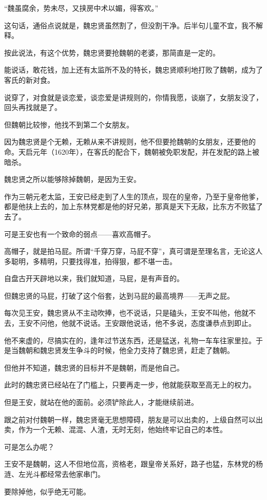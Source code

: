 \begin{multicols}{\theparacolNo}
“魏虽腐余，势未尽，又挟房中术以媚，得客欢。”

这句话，通俗点说就是，魏忠贤虽然割了，但没割干净。后半句儿童不宜，我不解释。

按此说法，有这个优势，魏忠贤要抢魏朝的老婆，那简直是一定的。

能说话，敢花钱，加上还有太监所不及的特长，魏忠贤顺利地打败了魏朝，成为了客氏的新对食。

说穿了，对食就是谈恋爱，谈恋爱是讲规则的，你情我愿，谈崩了，女朋友没了，回头再找就是了。

但魏朝比较惨，他找不到第二个女朋友。

因为魏忠贤是个无赖，无赖从来不讲规则，他不但要抢魏朝的女朋友，还要他的命。天启元年（1620年），在客氏的配合下，魏朝被免职发配，并在发配的路上被暗杀。

魏忠贤之所以能够除掉魏朝，是因为王安。

作为三朝元老太监，王安已经走到了人生的顶点，现在的皇帝，乃至于皇帝他爹，都是他扶上去的，加上东林党都是他的好兄弟，那真是天下无敌，比东方不败猛了去了。

可是王安也有一个致命的弱点——喜欢高帽子。

高帽子，就是拍马屁。所谓“千穿万穿，马屁不穿”，真可谓是至理名言，无论这人多聪明，多精明，只要找得准，拍得狠，都不堪一击。

自盘古开天辟地以来，我们就知道，马屁，是有声音的。

但魏忠贤的马屁，打破了这个俗套，达到马屁的最高境界——无声之屁。

每次见王安，魏忠贤从不主动吹捧，也不说话，只是磕头，王安不叫他，他就不去，王安不问他，他就不说话。王安跟他说话，他不多说，态度谦恭点到即止。

他不来虚的，尽搞实在的，逢年过节送东西，还是猛送，礼物一车车往家里拉。于是当魏朝和魏忠贤发生争斗的时候，他全力支持了魏忠贤，赶走了魏朝。

但他并不知道，魏忠贤的目标并不是魏朝，而是他自己。

此时的魏忠贤已经站在了门槛上，只要再走一步，他就能获取至高无上的权力。

但是王安，就站在他的面前。必须铲除此人，才能继续前进。

跟之前对付魏朝一样，魏忠贤毫无思想障碍，朋友是可以出卖的，上级自然可以出卖，作为一个无赖、混混、人渣，无时无刻，他始终牢记自己的本性。

可是怎么办呢？

王安不是魏朝，这人不但地位高，资格老，跟皇帝关系好，路子也猛，东林党的杨涟、左光斗都经常去他家串门。

要除掉他，似乎绝无可能。


\end{multicols}
